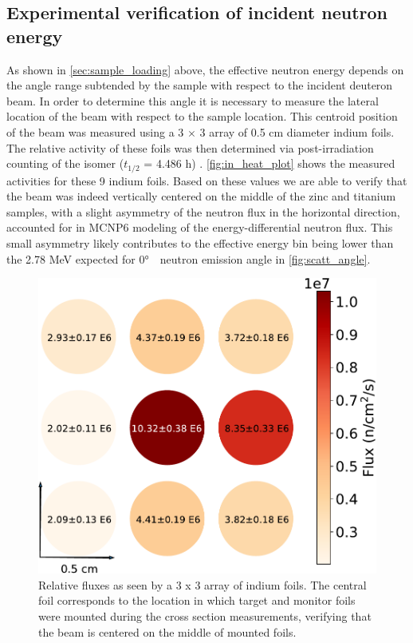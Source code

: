 \subsection{Experimental verification of incident neutron energy}\label{sec:lee_sec}

As shown in \autoref{sec:sample_loading} above, the effective neutron energy depends on the angle range subtended by the sample with respect to the incident deuteron beam.
 In order to determine this angle it is necessary to measure the lateral location of the beam with respect to the sample location.
 This centroid position of the beam was measured using a 3 $\times$ 3 array of 0.5 cm diameter indium foils.
 The relative activity of these foils was then determined via post-irradiation counting of the  isomer ($t_{1/2}$ = 4.486 h) \cite{Blachot2012}.
 \autoref{fig:in_heat_plot}  shows the measured activities for these 9 indium foils.
 Based on these values we are able to verify that the beam was indeed vertically centered on the middle of the zinc and titanium samples,  with a slight asymmetry of the neutron flux in the horizontal direction, accounted for in MCNP6 modeling of the energy-differential neutron flux. This small asymmetry likely contributes to the effective energy bin being lower than the 2.78 MeV expected for 0\si{\degree}\ \degree\ neutron emission angle in \autoref{fig:scatt_angle}.
  


\begin{figure}
 \centering
 \includegraphics[scale=0.55]{./figures/fig1_cropped.pdf}
 \caption{Relative fluxes as seen by a 3 x 3 array of indium foils. The central foil corresponds to the location in which target and monitor foils were mounted during the cross section measurements, verifying that the beam is centered on the middle of mounted foils.}
 \label{fig:in_heat_plot}
\end{figure}




